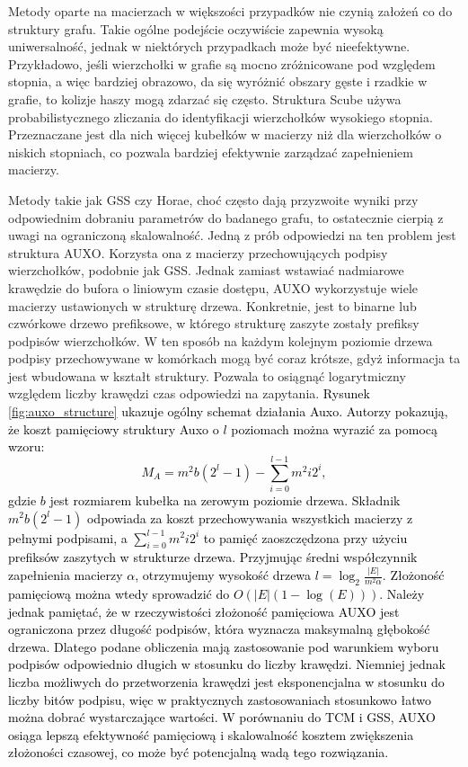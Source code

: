     Metody oparte na macierzach w większości przypadków nie czynią założeń co do struktury grafu. Takie ogólne podejście oczywiście zapewnia wysoką uniwersalność, jednak w niektórych przypadkach może być nieefektywne. Przykładowo, jeśli wierzchołki w grafie są mocno zróżnicowane pod względem stopnia, a więc bardziej obrazowo, da się wyróżnić obszary gęste i rzadkie w grafie, to kolizje haszy mogą zdarzać się często. Struktura Scube\cite{Chen_Zhou_Chen_Jin_2022} używa probabilistycznego zliczania do identyfikacji wierzchołków wysokiego stopnia. Przeznaczane jest dla nich więcej kubełków w macierzy niż dla wierzchołków o niskich stopniach, co pozwala bardziej efektywnie zarządzać zapełnieniem macierzy. 

    Metody takie jak GSS czy Horae, choć często dają przyzwoite wyniki przy odpowiednim dobraniu parametrów do badanego grafu, to ostatecznie cierpią z uwagi na ograniczoną skalowalność. Jedną z prób odpowiedzi na ten problem jest struktura AUXO\cite{Jiang_Chen_Jin_2023}. Korzysta ona z macierzy przechowujących podpisy wierzchołków, podobnie jak GSS. Jednak zamiast wstawiać nadmiarowe krawędzie do bufora o liniowym czasie dostępu, AUXO wykorzystuje wiele macierzy ustawionych w strukturę drzewa. Konkretnie, jest to binarne lub czwórkowe drzewo prefiksowe, w którego strukturę zaszyte zostały prefiksy podpisów wierzchołków. W ten sposób na każdym kolejnym poziomie drzewa podpisy przechowywane w komórkach mogą być coraz krótsze, gdyż informacja ta jest wbudowana w kształt struktury. Pozwala to osiągnąć logarytmiczny względem liczby krawędzi czas odpowiedzi na zapytania. \textcolor{black}{Rysunek \ref{fig:auxo_structure} ukazuje ogólny schemat działania Auxo. Autorzy pokazują, że koszt pamięciowy struktury Auxo o $l$ poziomach można wyrazić za pomocą wzoru:
    \[
        M_A = m^2b(2^l - 1) - \sum\limits_{i = 0}^{l - 1} m^2 i 2^i,
    \]
    gdzie $b$ jest rozmiarem kubełka na zerowym poziomie drzewa. Składnik $m^2b(2^l - 1)$ odpowiada za koszt przechowywania wszystkich macierzy z pełnymi podpisami, a $\sum\limits_{i = 0}^{l - 1} m^2 i 2^i$ to pamięć zaoszczędzona przy użyciu prefiksów zaszytych  w strukturze drzewa. Przyjmując średni współczynnik zapełnienia macierzy $\alpha$, otrzymujemy wysokość drzewa $l = \log_{2} \frac{\vert E \vert}{m^2 \alpha}$. Złożoność pamięciową można wtedy sprowadzić do $O(|E|(1 - \log(E)))$. Należy jednak pamiętać, że w rzeczywistości złożoność pamięciowa AUXO jest ograniczona przez długość podpisów, która wyznacza maksymalną głębokość drzewa. Dlatego podane obliczenia mają zastosowanie pod warunkiem wyboru podpisów odpowiednio długich w stosunku do liczby krawędzi. Niemniej jednak liczba możliwych do przetworzenia krawędzi jest eksponencjalna w stosunku do liczby bitów podpisu, więc w praktycznych zastosowaniach stosunkowo łatwo można dobrać wystarczające wartości. W porównaniu do TCM i GSS, AUXO osiąga lepszą efektywność pamięciową i skalowalność kosztem zwiększenia złożoności czasowej, co może być potencjalną wadą tego rozwiązania.}

